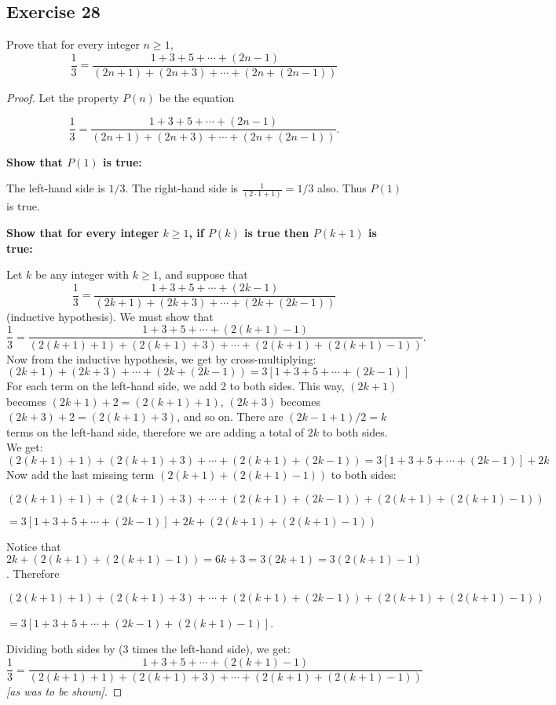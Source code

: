 \documentclass[14pt]{extarticle}
\newcommand{\dps}{\displaystyle}
\newcommand{\cy}{\color{cyan}}
\begin{document}
\subsection{Exercise 28}
Prove that for every integer $n \geq 1$,
\[
    \frac{1}{3} = \frac{1 + 3 + 5 + \cdots + (2n-1)}{(2n+1) + (2n+3) + \cdots + (2n + (2n-1))}
\]
\begin{proof}
    Let the property $P(n)$ be the equation

    \[
        \dps \frac{1}{3} = \frac{1 + 3 + 5 + \cdots + (2n-1)}{(2n+1) + (2n+3) + \cdots + (2n + (2n-1))}.
    \]

    {\bf Show that $P(1)$ is true:}

    The left-hand side is $1/3$. The right-hand side is $\dps \frac{1}{(2 \cdot 1 + 1)} = 1/3$ also. Thus $P(1)$ is true.

        {\bf Show that for every integer $k \geq 1$, if $P(k)$ is true then $P(k + 1)$ is true:}

    Let $k$ be any integer with $k \geq 1$, and suppose that
    \[
        \dps \frac{1}{3} = \frac{1 + 3 + 5 + \cdots + (2k-1)}{(2k+1) + (2k+3) + \cdots + (2k + (2k-1))}
    \]
    ({\cy inductive hypothesis}). We must show that
    \[
        \dps \frac{1}{3} = \frac{1 + 3 + 5 + \cdots + (2(k+1)-1)}{(2(k+1)+1) + (2(k+1)+3) + \cdots + (2(k+1) + (2(k+1)-1))}.\]
    Now from the inductive hypothesis, we get by cross-multiplying:
    \[
        (2k+1) + (2k+3) + \cdots + (2k + (2k-1)) = 3[1 + 3 + 5 + \cdots + (2k-1)]
    \]
    For each term on the left-hand side, we add 2 to both sides. This way, $(2k + 1)$ becomes $(2k + 1) + 2 = (2(k+1) + 1)$, $(2k + 3)$ becomes $(2k + 3) + 2 = (2(k+1) + 3)$, and so on. There are $(2k - 1 + 1) / 2 = k$ terms on the left-hand side, therefore we are adding a total of $2k$ to both sides. We get:
    \[
        (2(k+1)+1) + (2(k+1)+3) + \cdots + (2(k+1) + (2k-1)) = 3[1 + 3 + 5 + \cdots + (2k-1)] + 2k
    \]
    Now add the last missing term $(2(k+1) + (2(k+1)-1))$ to both sides:

    $(2(k+1)+1) + (2(k+1)+3) + \cdots + (2(k+1) + (2k-1)) + (2(k+1) + (2(k+1)-1))$

    $ = 3[1 + 3 + 5 + \cdots + (2k-1)] + 2k + (2(k+1) + (2(k+1)-1))$

    Notice that $2k + (2(k+1) + (2(k+1)-1)) = 6k + 3 = 3(2k+1) = 3(2(k+1) - 1)$. Therefore

    $(2(k+1)+1) + (2(k+1)+3) + \cdots + (2(k+1) + (2k-1)) + (2(k+1) + (2(k+1)-1))$

    $ = 3[1 + 3 + 5 + \cdots + (2k-1) + (2(k+1)-1)]$.

    Dividing both sides by (3 times the left-hand side), we get:
    \[
        \dps \frac{1}{3} = \frac{1 + 3 + 5 + \cdots + (2(k+1)-1)}{(2(k+1)+1) + (2(k+1)+3) + \cdots + (2(k+1) + (2(k+1)-1))}\]
    {\it [as was to be shown]}.
\end{proof}
\end{document}
